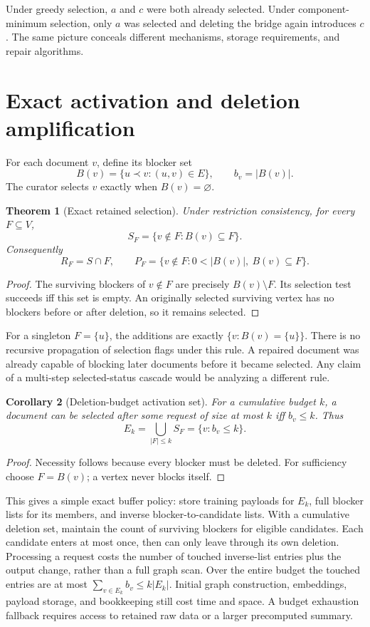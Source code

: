 \documentclass[11pt,a4paper]{article}
\newtheorem{theorem}{Theorem}[section]
\newtheorem{corollary}[theorem]{Corollary}
\theoremstyle{definition}\newtheorem{definition}[theorem]{Definition}
\newcommand{\minus}{\setminus}
\begin{document}
Under greedy selection, $a$ and $c$ were both already selected. Under component-minimum selection, only $a$ was selected and deleting the bridge again introduces $c$. The same picture conceals different mechanisms, storage requirements, and repair algorithms.

\section{Exact activation and deletion amplification}
For each document $v$, define its blocker set
\[
 B(v)=\{u\prec v:(u,v)\in E\},\qquad b_v=|B(v)|.
\]
The curator selects $v$ exactly when $B(v)=\varnothing$.

\begin{theorem}[Exact retained selection]\label{thm:activation}
Under restriction consistency, for every $F\subseteq V$,
\begin{equation}\label{eq:activation}
 S_F=\{v\notin F:B(v)\subseteq F\}.
\end{equation}
Consequently
\[
 R_F=S\cap F,\qquad
 P_F=\{v\notin F:0<|B(v)|,\ B(v)\subseteq F\}.
\]
\end{theorem}
\begin{proof}
The surviving blockers of $v\notin F$ are precisely $B(v)\minus F$. Its selection test succeeds iff this set is empty. An originally selected surviving vertex has no blockers before or after deletion, so it remains selected.
\end{proof}

For a singleton $F=\{u\}$, the additions are exactly $\{v:B(v)=\{u\}\}$. There is no recursive propagation of selection flags under this rule. A repaired document was already capable of blocking later documents before it became selected. Any claim of a multi-step selected-status cascade would be analyzing a different rule.

\begin{corollary}[Deletion-budget activation set]\label{cor:eligible}
For a cumulative budget $k$, a document can be selected after some request of size at most $k$ iff $b_v\le k$. Thus
\[
 E_k=\bigcup_{|F|\le k} S_F=\{v:b_v\le k\}.
\]
\end{corollary}
\begin{proof}
Necessity follows because every blocker must be deleted. For sufficiency choose $F=B(v)$; a vertex never blocks itself.
\end{proof}

This gives a simple exact buffer policy: store training payloads for $E_k$, full blocker lists for its members, and inverse blocker-to-candidate lists. With a cumulative deletion set, maintain the count of surviving blockers for eligible candidates. Each candidate enters at most once, then can only leave through its own deletion. Processing a request costs the number of touched inverse-list entries plus the output change, rather than a full graph scan. Over the entire budget the touched entries are at most $\sum_{v\in E_k}b_v\le k|E_k|$. Initial graph construction, embeddings, payload storage, and bookkeeping still cost time and space. A budget exhaustion fallback requires access to retained raw data or a larger precomputed summary.
\end{document}
